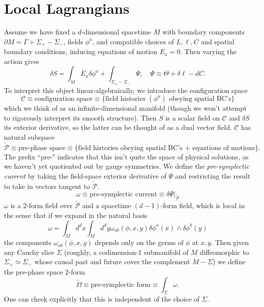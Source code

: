 \documentclass[11pt,letterpaper]{article}
\newcommand{\mc}[1]{\mathcal{#1}}
\newcommand{\D}{\partial}
\begin{document}
\section{Local Lagrangians}
Assume we have fixed a $d$-dimensional spacetime $M$ with boundary components $\D M = \Gamma + \Sigma_+ - \Sigma_-$, fields $\phi^a$, and compatible choices of $L, \ell, C$ and spatial boundary conditions, inducing equations of motion $E_a = 0$. Then varying the action gives \begin{equation}
\delta S = \int_M E_a \delta \phi^a + \int_{\Sigma_+ - \Sigma_-} \Psi, \quad \Psi \equiv \Theta + \delta \ell - dC.
\end{equation}
To interpret this object linear-algebraically, we introduce the configuration space \begin{equation}
\mc{C} \equiv \mbox{configuration space} \equiv \{ \mbox{field histories }  (\phi^a) \mbox{ obeying spatial BC's}\}
\end{equation}
which we think of as an infinite-dimensional manifold (though we won't attempt to rigorously interpret its smooth structure). Then $S$ is a scalar field on $\mc{C}$ and $\delta S$ its exterior derivative, so the latter can be thought of as a dual vector field. $\mc{C}$ has natural subspace \begin{equation}
\tilde{\mc{P}} \equiv \mbox{pre-phase space} \equiv \{\mbox{field histories obeying spatial BC's + equations of motions}\}.
\end{equation}
The prefix ``pre-" indicates that this isn't quite the space of physical solutions, as we haven't yet quotiented out by gauge symmetries. We define the \textit{pre-symplectic current} by taking the field-space exterior derivative of $\Psi$ and restricting the result to take in vectors tangent to $\tilde{\mc{P}}$. \begin{equation}
\omega \equiv \mbox{pre-symplectic current} \equiv \delta \Psi|_{\tilde{\mc{P}}}
\end{equation}
$\omega$ is a 2-form field over $\tilde{\mc{P}}$ and a spacetime $(d-1)$-form field, which is local in the sense that if we expand in the natural basis \begin{equation}
\omega = \int_M d^d x \int_M d^d y \omega_{ab}(\phi, x, y) \delta \phi^a(x) \wedge \delta \phi^b(y)
\end{equation}
the components $\omega_{ab} (\phi, x, y)$ depends only on the germs of $\phi$ at $x,y$. Then given any Cauchy slice $\Sigma$ (roughly, a codimension-1 submanifold of $M$ diffeomorphic to $\Sigma_+ \simeq \Sigma_-$ whose causal past and future cover the complement $M - \Sigma$) we define the pre-phase space 2-form \begin{equation}
\tilde{\Omega} \equiv \mbox{pre-symplectic form} \equiv \int_\Sigma \omega.
\end{equation}
One can check explicitly that this is independent of the choice of $\Sigma$.
\end{document}
